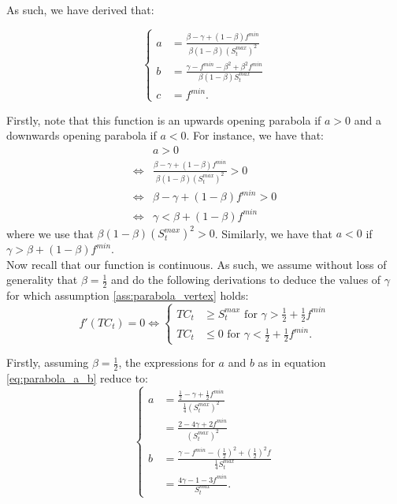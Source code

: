 \documentclass[12pt]{article}
\begin{document}
\begin{appendices}
        \noindent As such, we have derived that:
        
        \begin{equation} \label{eq:parabola_a_b}
		    \begin{cases}
		        a &= \frac{\beta - \gamma + (1-\beta)f^{min}}{\beta(1-\beta)\left(S^{max}_t\right)^2} \\
		        b &= \frac{\gamma - f^{min} - \beta^2 + \beta^2 f^{min}}{\beta(1-\beta)S^{max}_t} \\
		        c &= f^{min}.
		    \end{cases}
		\end{equation}
        
        Firstly, note that this function is an upwards opening parabola if $a>0$ and a downwards opening parabola if $a<0$. For instance, we have that:
        \begin{align*}
            & a > 0 \\
            \iff & \frac{\beta - \gamma + (1-\beta)f^{min}}{\beta(1-\beta)\left(S^{max}_t\right)^2} > 0 \\
            \iff & \beta - \gamma + (1-\beta)f^{min} > 0 \\
            \iff & \gamma < \beta + (1-\beta)f^{min}
        \end{align*}
        where we use that $\beta(1-\beta)\left(S^{max}_t\right)^2 > 0$. Similarly, we have that $a < 0$ if $\gamma > \beta + (1-\beta)f^{min}$. \\
        
        Now recall that our function is continuous. As such, we assume without loss of generality that $\beta = \frac{1}{2}$ and do the following derivations to deduce the values of $\gamma$ for which assumption \ref{ass:parabola_vertex} holds:
        \begin{equation*}
            f'(TC_t) = 0 \iff 
		    \begin{cases}
		        TC_t &\geq S^{max}_t \text{ for } \gamma > \frac{1}{2} + \frac{1}{2}f^{min} \\
		        TC_t &\leq 0 \text{ for } \gamma < \frac{1}{2} + \frac{1}{2}f^{min}.
		    \end{cases}
		\end{equation*}
		
		Firstly, assuming $\beta = \frac{1}{2}$, the expressions for $a$ and $b$ as in equation \eqref{eq:parabola_a_b} reduce to:
		\begin{equation} \label{eq:parabola_a_b_reduced}
		    \begin{cases}
		        a &= \frac{\frac{1}{2} - \gamma + \frac{1}{2}f^{min}}{\frac{1}{4}\left(S^{max}_t\right)^2} \\
		        &= \frac{2 - 4\gamma + 2f^{min}}{\left(S^{max}_t\right)^2} \\
		        b &= \frac{\gamma - f^{min} - \left(\frac{1}{2}\right)^2 + \left(\frac{1}{2}\right)^2 f}{\frac{1}{4}S^{max}_t} \\
		        &= \frac{4\gamma - 1 - 3f^{min}}{S^{max}_t}.
		    \end{cases}
		\end{equation}
		

\end{appendices}
\end{document}
